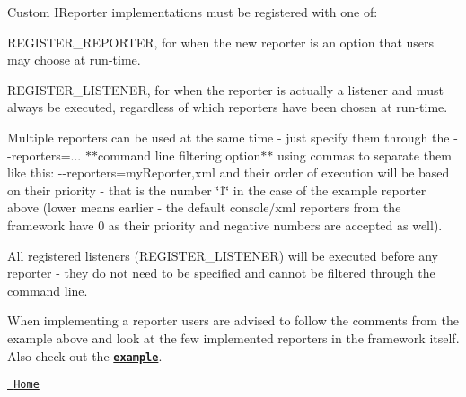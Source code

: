 \begin{DoxyCode}{0}
\DoxyCodeLine{}
\DoxyCodeLine{    \}}
\DoxyCodeLine{}
\DoxyCodeLine{}
\DoxyCodeLine{    \}}
\DoxyCodeLine{}
\DoxyCodeLine{\};}
\DoxyCodeLine{}
\DoxyCodeLine{}
\end{DoxyCode}


Custom {\ttfamily I\+Reporter} implementations must be registered with one of\+:


\begin{DoxyItemize}
\item {\ttfamily R\+E\+G\+I\+S\+T\+E\+R\+\_\+\+R\+E\+P\+O\+R\+T\+ER}, for when the new reporter is an option that users may choose at run-\/time.
\item {\ttfamily R\+E\+G\+I\+S\+T\+E\+R\+\_\+\+L\+I\+S\+T\+E\+N\+ER}, for when the reporter is actually a listener and must always be executed, regardless of which reporters have been chosen at run-\/time.
\end{DoxyItemize}

Multiple reporters can be used at the same time -\/ just specify them through the {\ttfamily -\/-\/reporters=...} $\ast$$\ast$command line filtering option$\ast$$\ast$ using commas to separate them like this\+: {\ttfamily -\/-\/reporters=my\+Reporter,xml} and their order of execution will be based on their priority -\/ that is the number \char`\"{}1\char`\"{} in the case of the example reporter above (lower means earlier -\/ the default console/xml reporters from the framework have 0 as their priority and negative numbers are accepted as well).

All registered listeners ({\ttfamily R\+E\+G\+I\+S\+T\+E\+R\+\_\+\+L\+I\+S\+T\+E\+N\+ER}) will be executed before any reporter -\/ they do not need to be specified and cannot be filtered through the command line.

When implementing a reporter users are advised to follow the comments from the example above and look at the few implemented reporters in the framework itself. Also check out the \href{../../examples/all_features/reporters_and_listeners.cpp}{\texttt{ {\bfseries{example}}}}.



\href{readme.md\#reference}{\texttt{ Home}}



